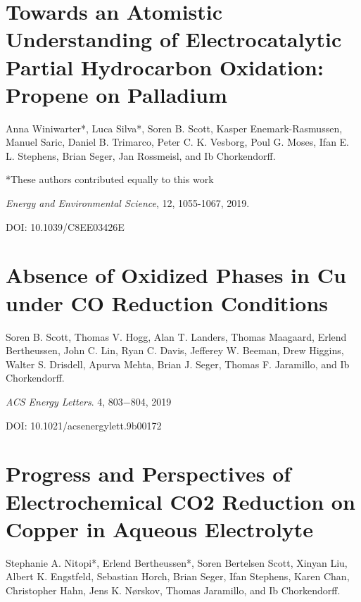 \begin{flushleft}
		
		
		\clearpage
		\section{Towards an Atomistic Understanding of Electrocatalytic Partial Hydrocarbon Oxidation: Propene on Palladium}\label{Winiwarter2019}
		
		Anna Winiwarter*, Luca Silva*, Soren B. Scott, Kasper Enemark-Rasmussen, Manuel Saric, Daniel B. Trimarco, Peter C. K. Vesborg, Poul G. Moses, Ifan E. L. Stephens, Brian Seger, Jan Rossmeisl, and Ib Chorkendorff.
		
		*These authors contributed equally to this work
		
		\textit{Energy and Environmental Science}, 12, 1055-1067, 2019.
		
		DOI:  10.1039/C8EE03426E
		
		
		
		
		
		
		\clearpage
		\section{Absence of Oxidized Phases in Cu under CO Reduction Conditions}\label{Scott2019_GIXRD}
		
		Soren B. Scott, Thomas V. Hogg, Alan T. Landers, Thomas Maagaard, Erlend Bertheussen, John C. Lin, Ryan C. Davis, Jefferey W. Beeman, Drew Higgins, Walter S. Drisdell, Apurva Mehta, Brian J. Seger, Thomas F. Jaramillo, and Ib Chorkendorff.
		
		\textit{ACS Energy Letters}. 4, 803−804, 2019
		
		DOI: 10.1021/acsenergylett.9b00172 
		
		





		\clearpage
		\section{Progress and Perspectives of Electrochemical CO2 Reduction on Copper in Aqueous Electrolyte}\label{Nitopi2019}
		
		Stephanie A. Nitopi*, Erlend Bertheussen*, Soren Bertelsen Scott, Xinyan Liu, Albert K. Engstfeld, Sebastian Horch, Brian Seger, Ifan Stephens, Karen Chan, Christopher Hahn, Jens K. Nørskov, Thomas Jaramillo, and Ib Chorkendorff.
		

\end{flushleft}
